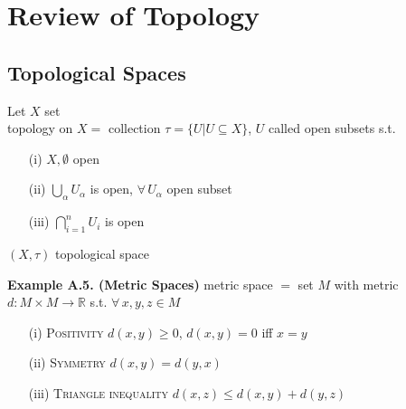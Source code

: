 %                                               
%                                                              
%

\section*{Review of Topology}

\subsection*{Topological Spaces}

Let $X$ set \\
topology on $X = $ collection $\tau = \lbrace U | U \subseteq X \rbrace$, $U$ called open subsets s.t.
\begin{enumerate}
\item[(i)] $X, \emptyset$ open 
\item[(ii)] $\bigcup_{\alpha} U_{\alpha}$ is open, $\forall \, U_{\alpha}$ open subset
\item[(iii)] $\bigcap_{i=1}^n U_i$ is open
\end{enumerate}

$(X,\tau)$ topological space


\textbf{Example A.5. (Metric Spaces)}
metric space $=$ set $M$ with metric $d: M \times M \to \mathbb{R}$ s.t. $\forall \, x, y, z \in M$
\begin{enumerate}
\item[(i)] \textsc{Positivity} $d(x,y) \geq 0$, $d(x,y) =0$ iff $x=y$ 
\item[(ii)] \textsc{Symmetry} $d(x,y) =d(y,x)$
\item[(iii)] \textsc{Triangle inequality} $d(x,z) \leq d(x,y) + d(y,z)$
\end{enumerate}

